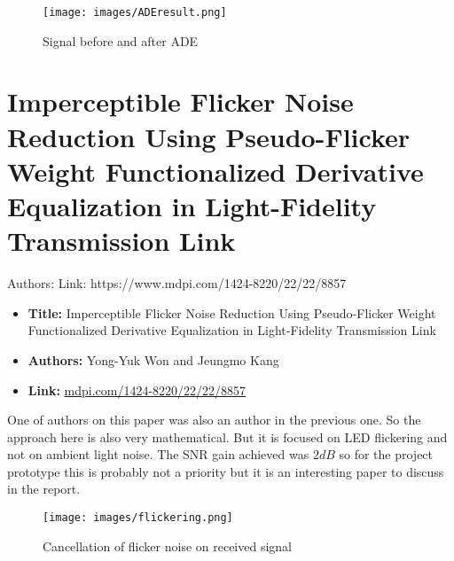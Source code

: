 \documentclass[a4paper,12pt,twoside]{article}
\begin{document}
	\begin{figure}[h]
		\centering
		\texttt{[image: images/ADEresult.png]}
		\caption{Signal before and after ADE}
	\end{figure}
	
	\section{Imperceptible Flicker Noise Reduction Using Pseudo-Flicker Weight Functionalized Derivative Equalization in Light-Fidelity Transmission Link}
	Authors: 
	Link: https://www.mdpi.com/1424-8220/22/22/8857
	\begin{tcolorbox}
	\begin{itemize}
		\item \textbf{Title:} Imperceptible Flicker Noise Reduction Using Pseudo-Flicker Weight Functionalized Derivative Equalization in Light-Fidelity Transmission Link
		\item \textbf{Authors:} Yong-Yuk Won and Jeungmo Kang
		\item \textbf{Link:} \href{https://www.mdpi.com/1424-8220/22/22/8857}{mdpi.com/1424-8220/22/22/8857}
	\end{itemize}
	\end{tcolorbox}
	
	One of authors on this paper was also an author in the previous one. So the approach here is also very mathematical. But it is focused on LED flickering and not on ambient light noise. The SNR gain achieved was $2 dB$ so for the project prototype this is probably not a priority but it is an interesting paper to discuss in the report.
	
	\begin{figure}[h]
		\centering
		\texttt{[image: images/flickering.png]}
		\caption{Cancellation of flicker noise on received signal}
	\end{figure}
	
	
\end{document}
